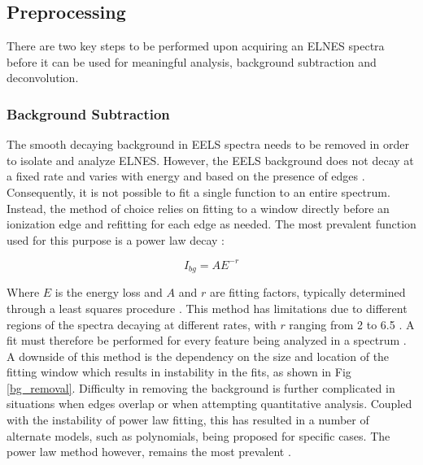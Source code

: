 \subsection{Preprocessing}

There are two key steps to be performed upon acquiring an ELNES spectra before it can be used for meaningful analysis, background subtraction and deconvolution. 





\subsubsection{Background Subtraction} \label{bg_section}
The smooth decaying background in EELS spectra needs to be removed in order to isolate and analyze ELNES.  However, the EELS background does not decay at a fixed rate and varies with energy and based on the presence of edges \cite{new_bg}. Consequently, it is not possible to fit a single function to an entire spectrum.  Instead, the method of choice relies on fitting to a window directly before an ionization edge and refitting for each edge as needed.  The most prevalent function used for this purpose is a power law decay \cite{Egerton}: 

\begin{equation}
	I_{bg} = AE^{-r}
\end{equation}


Where $E$ is the energy loss and $A$ and $r$ are fitting factors, typically determined through a least squares procedure \cite{reimer_transmission_2008}.  This method has limitations due to different regions of the spectra decaying at different rates, with $r$ ranging from 2 to 6.5 \cite{reimer_transmission_2008}. A fit must therefore be performed for every feature being analyzed in a spectrum \cite{verbeeck_model_2004, egerton_inelastic_1975}.  A downside of this method is the dependency on the size and location of the fitting window which results in instability in the fits, as shown in Fig \ref{bg_removal}.  Difficulty in removing the background is further complicated in situations when edges overlap or when attempting quantitative analysis.  Coupled with the instability of power law fitting, this has resulted in a number of alternate models, such as polynomials, being proposed for specific cases. The power law method however, remains the most prevalent \cite{verbeeck_model_2004, riedl_extraction_2006}.  

